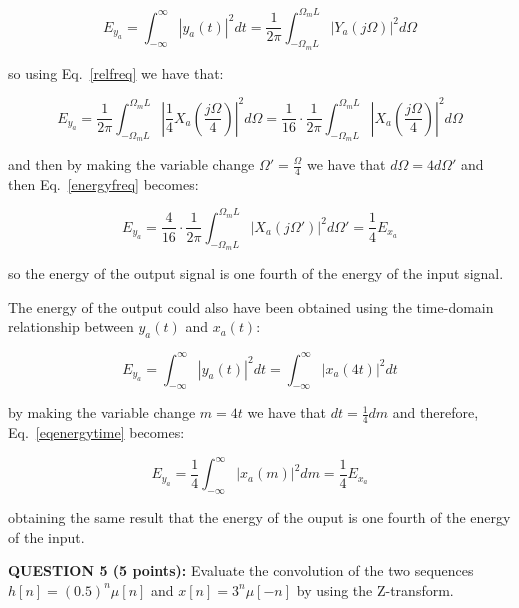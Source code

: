 \documentclass[a4paper,11pt,oneside]{article}
\begin{document}
\begin{equation}\label{eqenergy}
E_{y_a}=\int_{-\infty}^{\infty}|y_a(t)|^2dt=\frac{1}{2\pi}\int_{-\Omega_mL}^{\Omega_mL}|Y_a(j\Omega)|^2d\Omega
\end{equation}

so using Eq.~\ref{relfreq} we have that:

\begin{equation}\label{energyfreq}
E_{y_a}=\frac{1}{2\pi}\int_{-\Omega_mL}^{\Omega_mL}|\frac{1}{4}X_a(\frac{j\Omega}{4})|^2d\Omega=\frac{1}{16}\cdot\frac{1}{2\pi}\int_{-\Omega_mL}^{\Omega_mL}|X_a(\frac{j\Omega}{4})|^2d\Omega
\end{equation}

and then by making the variable change $\Omega'=\frac{\Omega}{4}$ we have that $d\Omega=4d\Omega'$ and then Eq.~\ref{energyfreq} becomes:

\begin{equation}
E_{y_a}= \frac{4}{16}\cdot\frac{1}{2\pi}\int_{-\Omega_mL}^{\Omega_mL}|X_a(j\Omega')|^2d\Omega'=\frac{1}{4}E_{x_a}
\end{equation}

so the energy of the output signal is one fourth of the energy of the input signal.

The energy of the output could also have been obtained using the time-domain relationship between $y_a(t)$ and $x_a(t)$:

\begin{equation}\label{eqenergytime}
E_{y_a}=\int_{-\infty}^{\infty}|y_a(t)|^2dt=\int_{-\infty}^{\infty}|x_a(4t)|^2dt
\end{equation}

by making the variable change $m=4t$ we have that $dt=\frac{1}{4}dm$ and therefore, Eq.~\ref{eqenergytime} becomes:


\begin{equation}
E_{y_a}=\frac{1}{4}\int_{-\infty}^{\infty}|x_a(m)|^2dm=\frac{1}{4}E_{x_a}
\end{equation}

obtaining the same result that the energy of the ouput is one fourth of the energy of the input.


\vspace{1cm}

\textbf{QUESTION 5 (5 points):} Evaluate the convolution of the two sequences $h[n]=(0.5)^n\mu[n]$ and $x[n]=3^n\mu[-n]$ by using the Z-transform.


\vspace{1cm}
\end{document}
